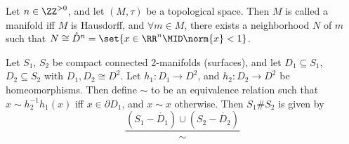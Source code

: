 \documentclass{fkbook}
\begin{document}
\begin{adjustwidth}{1em}{1em}
  \begin{definition}[Manifolds]
    Let $n \in \ZZ^{>0}$, and let $(M, \tau)$ be a topological space.
    Then $M$ is called a manifold iff $M$ is Hausdorff, and $\forall m
    \in M$, there exists a neighborhood $N$ of $m$ such that $N \cong
    \mathring{D}^n = \set{x \in \RR^n \MID \norm{x} < 1}$.
  \end{definition}
  \begin{definition}
    Let $S_1$, $S_2$ be compact connected 2-manifolds (surfaces), and
    let $D_1 \subseteq S_1$, $D_2 \subseteq S_2$ with $D_1, D_2 \cong
    D^2$. Let $h_1 : D_1 \to D^2$, and $h_2 : D_2 \to D^2$ be
    homeomorphisms. Then define $\sim$ to be an equivalence relation
    such that $x \sim h^{-1}_2 h_1(x)$ iff $x \in \partial D_1$, and
    $x \sim x$ otherwise. Then $S_1 \# S_2$ is given by
    \[
      \frac{(S_1 - \mathring{D_1}) \cup (S_2 - \mathring{D_2})}{\sim}
    \]
  \end{definition}


\end{adjustwidth}
\end{document}
